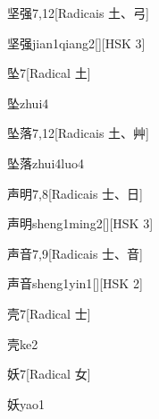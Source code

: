 \begin{entry}{坚强}{7,12}[Radicais ⼟、⼸]
  \begin{phonetics}{坚强}{jian1qiang2}[][HSK 3]
  \end{phonetics}
\end{entry}

\begin{entry}{坠}{7}[Radical ⼟]
  \begin{phonetics}{坠}{zhui4}
  \end{phonetics}
\end{entry}

\begin{entry}{坠落}{7,12}[Radicais ⼟、⾋]
  \begin{phonetics}{坠落}{zhui4luo4}
  \end{phonetics}
\end{entry}

\begin{entry}{声明}{7,8}[Radicais ⼠、⽇]
  \begin{phonetics}{声明}{sheng1ming2}[][HSK 3]
  \end{phonetics}
\end{entry}

\begin{entry}{声音}{7,9}[Radicais ⼠、⾳]
  \begin{phonetics}{声音}{sheng1yin1}[][HSK 2]
  \end{phonetics}
\end{entry}

\begin{entry}{壳}{7}[Radical ⼠]
  \begin{phonetics}{壳}{ke2}
  \end{phonetics}
\end{entry}

\begin{entry}{妖}{7}[Radical ⼥]
  \begin{phonetics}{妖}{yao1}
  \end{phonetics}
\end{entry}

